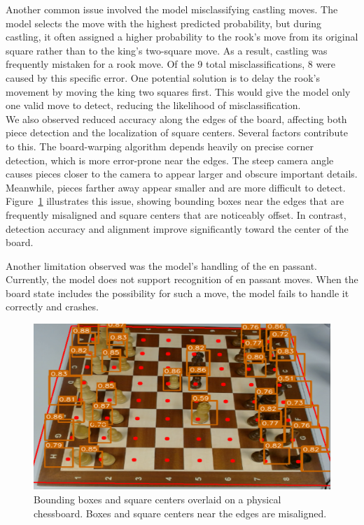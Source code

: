Another common issue involved the model misclassifying castling moves. The model selects the move with the highest predicted probability, but during castling, it often assigned a higher probability to the rook’s move from its original square rather than to the king’s two-square move. As a result, castling was frequently mistaken for a rook move. Of the 9 total misclassifications, 8 were caused by this specific error. One potential solution is to delay the rook’s movement by moving the king two squares first. This would give the model only one valid move to detect, reducing the likelihood of misclassification. \\

We also observed reduced accuracy along the edges of the board, affecting both piece detection and the localization of square centers. Several factors contribute to this. The board-warping algorithm depends heavily on precise corner detection, which is more error-prone near the edges. The steep camera angle causes pieces closer to the camera to appear larger and obscure important details. Meanwhile, pieces farther away appear smaller and are more difficult to detect. Figure~\ref{fig:bbox-centers-incorrect} illustrates this issue, showing bounding boxes near the edges that are frequently misaligned and square centers that are noticeably offset. In contrast, detection accuracy and alignment improve significantly toward the center of the board.

Another limitation observed was the model's handling of the en passant. Currently, the model does not support recognition of en passant moves. When the board state includes the possibility for such a move, the model fails to handle it correctly and crashes.


\begin{figure}[h!]
    \centering
    \includegraphics[width=0.75\linewidth]{figures/discussion/bbox-centers-incorrect.png}
    \caption{Bounding boxes and square centers overlaid on a physical chessboard. Boxes and square centers near the edges are misaligned.}
    \label{fig:bbox-centers-incorrect}
\end{figure}


